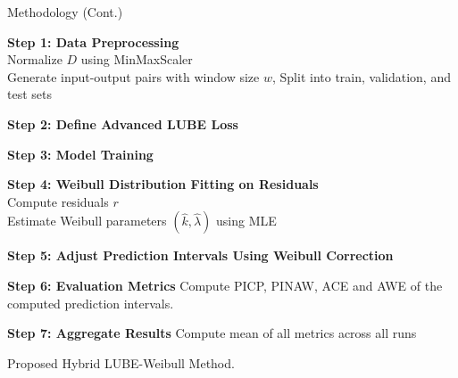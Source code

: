 \documentclass[xcolor=dvipsnames,aspectratio=169]{beamer}
\begin{document}
\begin{frame}{Methodology (Cont.)}
    \begin{algorithm}[H]
        \tiny
        \SetAlgoCaptionSeparator{:}

        
        \textbf{Step 1: Data Preprocessing}\\
        Normalize $D$ using MinMaxScaler\\
        Generate input-output pairs with window size $w$, 
        Split into train, validation, and test sets
        
        \textbf{Step 2: Define Advanced LUBE Loss}\\
        
        \textbf{Step 3: Model Training}\\
        
        \textbf{Step 4: Weibull Distribution Fitting on Residuals}\\
        Compute residuals $r$\\
        Estimate Weibull parameters $(\hat{k}, \hat{\lambda})$ using MLE
        
        \textbf{Step 5: Adjust Prediction Intervals Using Weibull Correction}\\
        
        \textbf{Step 6: Evaluation Metrics} Compute PICP, PINAW, ACE and AWE of the computed prediction intervals.
        
        \textbf{Step 7: Aggregate Results} Compute mean of all metrics across all runs
        
        \caption{Proposed Hybrid LUBE-Weibull Method.}
    \end{algorithm}
\end{frame}
\end{document}
